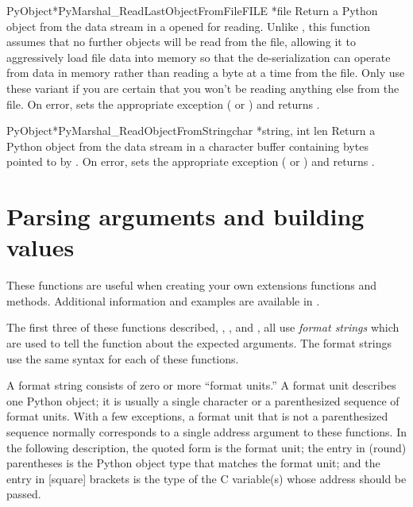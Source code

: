 \begin{cfuncdesc}{PyObject*}{PyMarshal_ReadLastObjectFromFile}{FILE *file}
  Return a Python object from the data stream in a 
  opened for reading.  Unlike
  , this function assumes
  that no further objects will be read from the file, allowing it to
  aggressively load file data into memory so that the de-serialization
  can operate from data in memory rather than reading a byte at a time
  from the file.  Only use these variant if you are certain that you
  won't be reading anything else from the file.  On error, sets the
  appropriate exception ( or
  ) and returns \NULL.
\end{cfuncdesc}

\begin{cfuncdesc}{PyObject*}{PyMarshal_ReadObjectFromString}{char *string,
                                                             int len}
  Return a Python object from the data stream in a character buffer
  containing  bytes pointed to by .  On error,
  sets the appropriate exception ( or
  ) and returns \NULL.
\end{cfuncdesc}


\section{Parsing arguments and building values
         \label{arg-parsing}}

These functions are useful when creating your own extensions functions
and methods.  Additional information and examples are available in
.

The first three of these functions described,
,
, and
, all use \emph{format strings} which are
used to tell the function about the expected arguments.  The format
strings use the same syntax for each of these functions.

A format string consists of zero or more ``format units.''  A format
unit describes one Python object; it is usually a single character or
a parenthesized sequence of format units.  With a few exceptions, a
format unit that is not a parenthesized sequence normally corresponds
to a single address argument to these functions.  In the following
description, the quoted form is the format unit; the entry in (round)
parentheses is the Python object type that matches the format unit;
and the entry in [square] brackets is the type of the C variable(s)
whose address should be passed.

